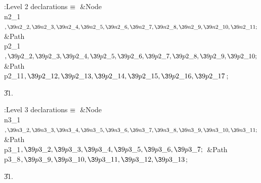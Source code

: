 \B{}:Level 2 declarations\X${}\equiv{}$\6
\&{Node} \\{n2\_1}${},\39\\{n2\_2},\39\\{n2\_3},\39\\{n2\_4},\39\\{n2\_5},\39%
\\{n2\_6},\39\\{n2\_7},\39\\{n2\_8},\39\\{n2\_9},\39\\{n2\_10},\39\\{n2%
\_11};{}$\6
\&{Path} \\{p2\_1}${},\39\\{p2\_2},\39\\{p2\_3},\39\\{p2\_4},\39\\{p2\_5},\39%
\\{p2\_6},\39\\{p2\_7},\39\\{p2\_8},\39\\{p2\_9},\39\\{p2\_10};{}$\6
\&{Path} \\{p2\_11}${},\39\\{p2\_12},\39\\{p2\_13},\39\\{p2\_14},\39\\{p2\_15},%
\39\\{p2\_16},\39\\{p2\_17}{}$;\par
\U31.\fi

\B{}:Level 3 declarations\X${}\equiv{}$\6
\&{Node} \\{n3\_1}${},\39\\{n3\_2},\39\\{n3\_3},\39\\{n3\_4},\39\\{n3\_5},\39%
\\{n3\_6},\39\\{n3\_7},\39\\{n3\_8},\39\\{n3\_9},\39\\{n3\_10},\39\\{n3%
\_11};{}$\6
\&{Path} \\{p3\_1}${},\39\\{p3\_2},\39\\{p3\_3},\39\\{p3\_4},\39\\{p3\_5},\39%
\\{p3\_6},\39\\{p3\_7};{}$\6
\&{Path} \\{p3\_8}${},\39\\{p3\_9},\39\\{p3\_10},\39\\{p3\_11},\39\\{p3\_12},%
\39\\{p3\_13}{}$;\par
\U31.\fi

